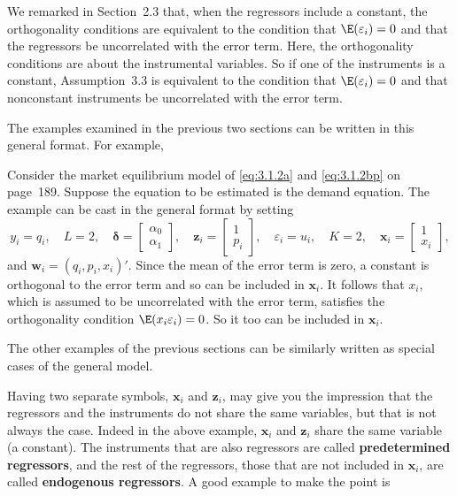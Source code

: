 We remarked in Section~2.3 that, when the regressors include a constant, the orthogonality
conditions are equivalent to the condition that $\E(\varepsilon_i) = 0$ and that the
regressors be uncorrelated with the error term.  Here, the orthogonality conditions are
about the instrumental variables.  So if one of the instruments is a constant, Assumption~3.3
is equivalent to the condition that $\E(\varepsilon_i) = 0$ and that nonconstant instruments be
uncorrelated with the error term.

The examples examined in the previous two sections can be written in this
general format.  For example,

\begin{example}
\label{ex:3.1}
Consider the market equilibrium model of \eqref{eq:3.1.2a} and \eqref{eq:3.1.2bp} on
page~189.  Suppose the equation to be estimated is the demand equation.  The example
can be cast in the general format by setting
\[
  y_i = q_i, \quad L = 2, \quad
  \boldsymbol{\delta} = \begin{bmatrix} \alpha_0 \\ \alpha_1 \end{bmatrix}, \quad
  \mathbf{z}_i = \begin{bmatrix} 1 \\ p_i \end{bmatrix}, \quad
  \varepsilon_i = u_i, \quad K = 2, \quad
  \mathbf{x}_i = \begin{bmatrix} 1 \\ x_i \end{bmatrix},
\]
and $\mathbf{w}_i = (q_i, p_i, x_i)'$.  Since the mean of the error term is zero, a constant is
orthogonal to the error term and so can be included in $\mathbf{x}_i$.  It follows that $x_i$,
which is assumed to be uncorrelated with the error term, satisfies the orthogonality
condition $\E(x_i \varepsilon_i) = 0$.  So it too can be included in $\mathbf{x}_i$.
\end{example}

The other examples of the previous sections can be similarly written as special
cases of the general model.

Having two separate symbols, $\mathbf{x}_i$ and $\mathbf{z}_i$, may give you the impression that
the regressors and the instruments do not share the same variables, but that is not
always the case.  Indeed in the above example, $\mathbf{x}_i$ and $\mathbf{z}_i$ share the same variable
(a constant).  The instruments that are also regressors are called \textbf{predetermined
regressors}, and the rest of the regressors, those that are not included in $\mathbf{x}_i$, are
called \textbf{endogenous regressors}.  A good example to make the point is

